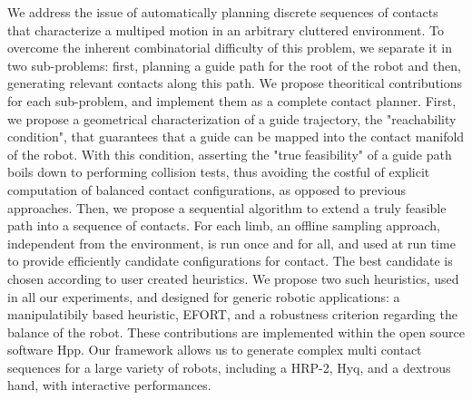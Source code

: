 We address the issue of automatically planning discrete sequences of contacts
that characterize a multiped motion in an arbitrary cluttered environment.
To overcome the inherent combinatorial difficulty of this problem, we separate it
in two sub-problems: first, planning a guide path for the root of the robot and
then, generating relevant contacts along this path.
We propose theoritical contributions for each sub-problem, and implement them
as a complete contact planner. 
First, we propose a geometrical characterization of a guide trajectory, the "reachability condition", that guarantees that a
guide can be mapped into the contact manifold of the robot. With this condition, asserting the "true feasibility" 
of a guide path boils down to performing collision tests, thus avoiding the costful of explicit computation of balanced contact configurations, as opposed to previous approaches.
Then, we propose a sequential algorithm to extend a truly feasible path into a sequence of contacts. For each limb, an offline sampling approach,
independent from the environment, is run once and for all, and used at run time to provide efficiently candidate configurations for contact.
The best candidate is chosen according to user created heuristics. We propose two such heuristics, used in all our experiments, and 
designed for generic robotic applications: a manipulatibily based heuristic, EFORT, and a robustness criterion regarding the balance of the robot.
These contributions are implemented within the open source software Hpp. Our framework allows us to generate complex multi contact sequences for a large
variety of robots, including a HRP-2, Hyq, and a dextrous hand, with interactive performances.
